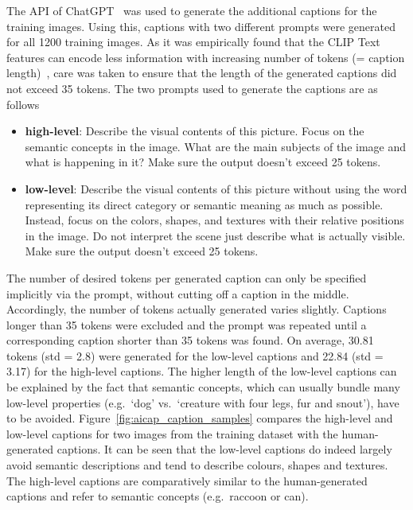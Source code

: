 The API of ChatGPT~\cite{OpenAI_ChatGPT_2024} was used to generate the additional captions for the training images. Using this, captions with two different prompts were generated for all 1200 training images. As it was empirically found that the CLIP Text features can encode less information with increasing number of tokens (= caption length)~\cite{zhangLongCLIPUnlockingLongText2024}, care was taken to ensure that the length of the generated captions did not exceed 35 tokens. The two prompts used to generate the captions are as follows
\begin{itemize}
    \item \textbf{high-level}: Describe the visual contents of this picture. Focus on the semantic concepts in the image. What are the main subjects of the image and what is happening in it? Make sure the output doesn't exceed 25 tokens.
    \item \textbf{low-level}: Describe the visual contents of this picture without using the word representing its direct category or semantic meaning as much as possible. Instead, focus on the colors, shapes, and textures with their relative positions in the image. Do not interpret the scene just describe what is actually visible. Make sure the output doesn't exceed 25 tokens.
\end{itemize}

The number of desired tokens per generated caption can only be specified implicitly via the prompt, without cutting off a caption in the middle. Accordingly, the number of tokens actually generated varies slightly. Captions longer than 35 tokens were excluded and the prompt was repeated until a corresponding caption shorter than 35 tokens was found. On average, 30.81 tokens (std = 2.8) were generated for the low-level captions and 22.84 (std = 3.17) for the high-level captions. The higher length of the low-level captions can be explained by the fact that semantic concepts, which can usually bundle many low-level properties (e.g.\ `dog' vs.\ `creature with four legs, fur and snout'), have to be avoided. Figure~\ref{fig:aicap_caption_samples} compares the high-level and low-level captions for two images from the training dataset with the human-generated captions. It can be seen that the low-level captions do indeed largely avoid semantic descriptions and tend to describe colours, shapes and textures. The high-level captions are comparatively similar to the human-generated captions and refer to semantic concepts (e.g.\ raccoon or can).

